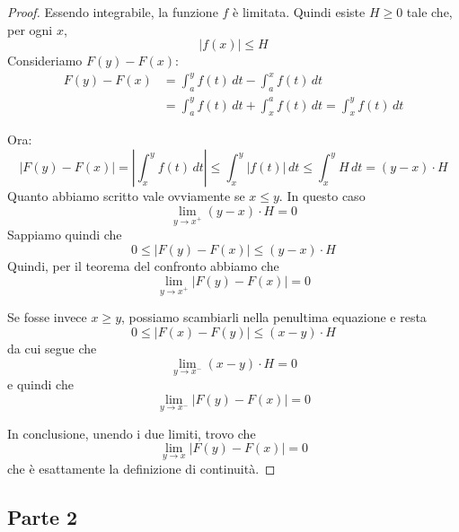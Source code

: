 \begin{proof}
Essendo integrabile, la funzione $f$ è limitata. Quindi esiste $H \ge 0$ tale che, per ogni $x$,
\begin{equation*}
|f(x)| \le H
\end{equation*}
Consideriamo $F(y)-F(x)$:
\begin{align*}
F(y)-F(x) &= \int_a^y f(t) \, dt - \int_a^x f(t) \, dt \\
&= \int_a^y f(t) \, dt + \int_x^a f(t) \, dt = \int_x^y f(t) \, dt
\end{align*}

Ora:
\begin{equation*}
|F(y)-F(x)| = \left\lvert \int_x^y f(t) \, dt \right\rvert \le \int_x^y |f(t)| \, dt \le \int_x^y H \, dt = (y-x) \cdot H
\end{equation*}
Quanto abbiamo scritto vale ovviamente se $x \le y$. In questo caso
\begin{equation*}
\lim_{y \to x^+} (y-x) \cdot H = 0
\end{equation*}
Sappiamo quindi che
\begin{equation*}
0 \le |F(y) - F(x)| \le (y-x) \cdot H 
\end{equation*}
Quindi, per il teorema del confronto abbiamo che
\begin{equation*}
\lim_{y \to x^+} |F(y)-F(x)| = 0
\end{equation*}

Se fosse invece $x \ge y$, possiamo scambiarli nella penultima equazione e resta
\begin{equation*}
0 \le |F(x) - F(y)| \le (x-y) \cdot H 
\end{equation*}
da cui segue che
\begin{equation*}
\lim_{y \to x^-} (x-y) \cdot H = 0
\end{equation*}
e quindi che
\begin{equation*}
\lim_{y \to x^-} |F(y)-F(x)| = 0
\end{equation*}

In conclusione, unendo i due limiti, trovo che
\begin{equation*}
\lim_{y \to x} |F(y)-F(x)| = 0
\end{equation*}
che è esattamente la definizione di continuità.
\end{proof}

\subsection{Parte 2}

